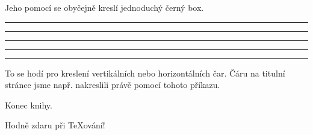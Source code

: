 \noindent Jeho pomocí se obyčejně kreslí jednoduchý černý box.

\begin{example}
\rule{3mm}{.1pt}%
\rule[-1mm]{5mm}{1cm}%
\rule{3mm}{.1pt}%
\rule[1mm]{1cm}{5mm}%
\rule{3mm}{.1pt}
\end{example}

\noindent To se hodí pro kreslení vertikálních nebo horizontálních
čar. Čáru na titulní stránce jsme např. nakreslili právě pomocí
tohoto příkazu.

\bigskip
\begin{flushright}
Konec knihy.\par 
Hodně zdaru při \TeX ování!
\end{flushright}

%

